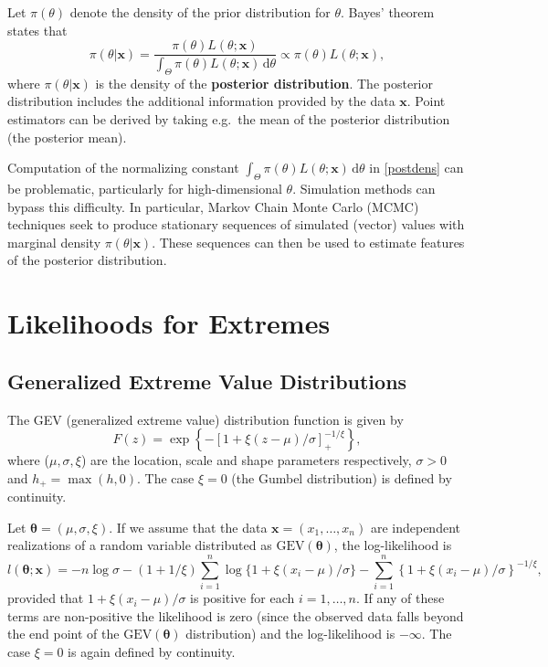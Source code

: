 \documentclass[11pt,a4paper]{article}
\newcommand{\bs}{\boldsymbol}
\begin{document}
Let $\pi(\theta)$ denote the density of the prior distribution for
$\theta$.  Bayes' theorem states that
\begin{equation}
  \pi(\theta|\bs{x}) =
  \frac{\pi(\theta)L(\theta;\bs{x})}{\int_{\Theta}
    \pi(\theta)L(\theta;\bs{x}) \, \text{d}\theta} \propto
  \pi(\theta)L(\theta;\bs{x}), 
  \label{postdens}
\end{equation} 
where $\pi(\theta|\bs{x})$ is the density of the \textbf{posterior
  distribution}.  The posterior distribution includes the additional
information provided by the data $\bs{x}$.  Point estimators can be
derived by taking e.g.\ the mean of the posterior distribution (the
posterior mean).

Computation of the normalizing constant $\int_{\Theta}
\pi(\theta)L(\theta;\bs{x}) \, \text{d}\theta$ in \eqref{postdens} can
be problematic, particularly for high-dimensional $\theta$.
Simulation methods can bypass this difficulty.  In particular, Markov
Chain Monte Carlo (MCMC) techniques seek to produce stationary
sequences of simulated (vector) values with marginal density
$\pi(\theta|\bs{x})$.  These sequences can then be used to estimate
features of the posterior distribution.

\section{Likelihoods for Extremes}
\setcounter{footnote}{0}
\label{lh}

\subsection{Generalized Extreme Value Distributions}
\label{lhgev}

The GEV (generalized extreme value) distribution function is given by
\begin{equation}
  F(z) = \exp \left\{ - \left[ 1+ \xi \left( z-\mu \right) /\sigma
    \right]_{+}^{-1/\xi} \right\}, 
\label{gev}
\end{equation}   
where ($\mu,\sigma,\xi$) are the location, scale and shape parameters
respectively, $\sigma > 0$ and $h_{+}=\max(h,0)$.  The case $\xi=0$
(the Gumbel distribution) is defined by continuity.

Let $\bs{\theta} = (\mu,\sigma,\xi)$.  If we assume that the data
$\bs{x} = (x_1,\dots,x_n)$ are independent realizations of a random
variable distributed as $\text{GEV}(\bs{\theta})$, the log-likelihood
is
\begin{equation}
  l(\bs{\theta};\bs{x}) = -n\log \sigma - (1 + 1/\xi) \sum_{i=1}^n
  \log\{1+ \xi \left( x_i-\mu \right) /\sigma\} - \sum_{i=1}^n
  \left\{ 1 + \xi \left( x_i-\mu \right) /\sigma  \right\}^{-1/\xi}, 
\label{gevlik}
\end{equation}
provided that $1 + \xi \left( x_i-\mu \right) /\sigma$ is positive for
each $i=1,\dots,n$.  If any of these terms are non-positive the
likelihood is zero (since the observed data falls beyond the end point
of the $\text{GEV}(\bs{\theta})$ distribution) and the log-likelihood
is $-\infty$.  The case $\xi=0$ is again defined by continuity.
  
\end{document}
